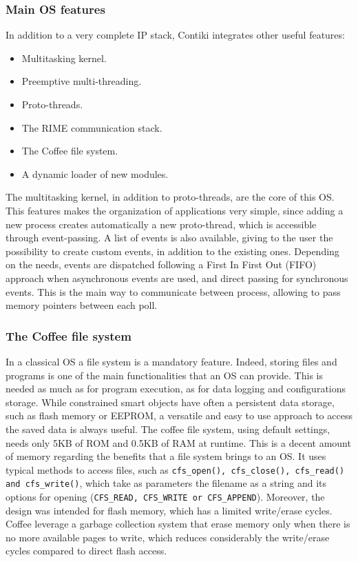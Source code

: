 \subsubsection{Main OS features}
In addition to a very complete IP stack, Contiki integrates other useful features:

\begin{itemize}
	\item Multitasking kernel.
	\item Preemptive multi-threading.
	\item Proto-threads\cite{dunkels2006protothreads}.
	\item The RIME communication stack\cite{dunkels2007rime}.
	\item The Coffee file system\cite{tsiftes09enabling}.
	\item A dynamic loader of new modules\cite{dunkels06runtime}.
\end{itemize}

The multitasking kernel, in addition to proto-threads, are the core of this OS.
This features makes the organization of applications very simple, since adding a new process creates automatically a new proto-thread, which is accessible through event-passing.
A list of events is also available, giving to the user the possibility to create custom events, in addition to the existing ones.
Depending on the needs, events are dispatched following a First In First Out (FIFO) approach when asynchronous events are used, and direct passing for synchronous events.
This is the main way to communicate between process, allowing to pass memory pointers between each poll.

\subsubsection{The Coffee file system}
In a classical OS a file system is a mandatory feature.
Indeed, storing files and programs is one of the main functionalities that an OS can provide.
This is needed as much as for program execution, as for data logging and configurations storage.
While constrained smart objects have often a persistent data storage, such as flash memory or EEPROM, a versatile and easy to use approach to access the saved data is always useful.
The coffee file system, using default settings, needs only 5KB of ROM and 0.5KB of RAM at runtime.
This is a decent amount of memory regarding the benefits that a file system brings to an OS.
It uses typical methods to access files, such as \texttt{cfs\_open(), cfs\_close(), cfs\_read() and cfs\_write()}, which take as parameters the filename as a string and its options for opening (\texttt{CFS\_READ, CFS\_WRITE or CFS\_APPEND}).
Moreover, the design was intended for flash memory, which has a limited write/erase cycles.
Coffee leverage a garbage collection system that erase memory only when there is no more available pages to write, which reduces considerably the write/erase cycles compared to direct flash access.

